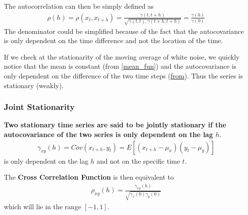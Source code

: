 \documentclass[../main.tex]{subfiles}
\begin{document}
    The autocorrelation can then be simply defined as
    \begin{align*}
        \rho (h) = \rho(x_{t}, x_{t+h}) = \frac{\gamma (t,t+h)}{\sqrt{\gamma(t, t), \gamma(t+h, t+h)}} = \frac{\gamma(h)}{\gamma(0)}
    \end{align*}
    The denominator could be simplified because of the fact that the autocovariance is only dependent on the time difference and not the location of the time.\newline

    If we check at the stationarity of the moving average of white noise, we quickly notice that the mean is constant (from \ref{mean_fun}) and the autocovariance is only dependent on the difference of the two time steps (\hyperlink{ma_noise_cov}{from}). Thus the series is stationary (weakly).

    \subsubsection{Joint Stationarity}
    \textbf{Two stationary time series are said to be jointly stationary if the autocovariance of the two series is only dependent on the lag $h$}.\newline
    \begin{align*}
        \gamma_{xy}(h) = Cov(x_{t+h}, y_{t}) = E[(x_{t+h} - \mu_{x})(y_{t} - \mu_{y})]
    \end{align*}
    is only dependent on the lag $h$ and not on the specific time $t$.\newline

    The \textbf{Cross Correlation Function} is then equivalent to
    \begin{align*}
        \rho_{xy}(h) = \frac{\gamma_{xy}(h)}{\sqrt{\gamma_{x}(0) \gamma_{y}(0)}}
    \end{align*}
    which will lie in the range $[-1,1]$.
\end{document}
